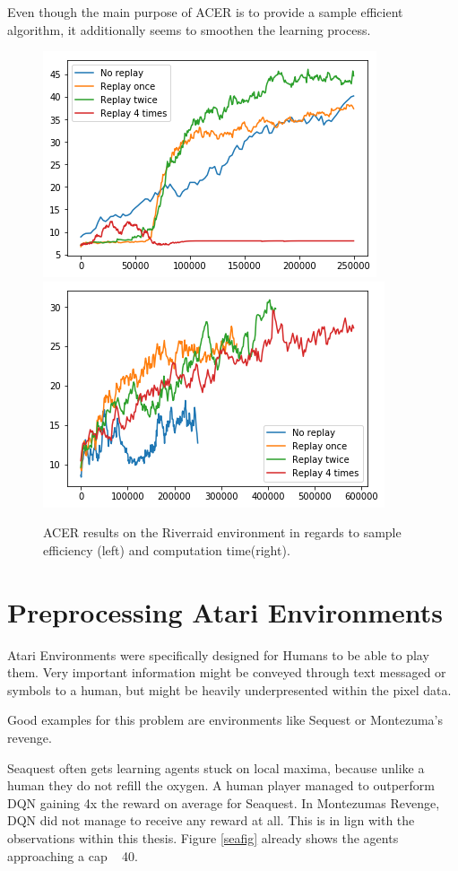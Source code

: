 Even though the main purpose of ACER is to provide a sample efficient algorithm, it additionally seems to smoothen the learning process.
\begin{figure}[h]
\includegraphics[scale=0.55]{bilder/riverraidbyonline.png}
\includegraphics[scale=0.55]{bilder/riverraidbytime.png}
\caption{ACER results on the Riverraid environment in regards to sample efficiency (left) and computation time(right).}

\end{figure}

\pagebreak

\section{Preprocessing Atari Environments}

Atari Environments were specifically designed for Humans to be able to play them. Very important information might be conveyed through text messaged or symbols to a human, but might be heavily underpresented within the pixel data.

Good examples for this problem are environments like Sequest or Montezuma's revenge. 

Seaquest often gets learning agents stuck on local maxima, because unlike a human they do not refill the oxygen.
A human player managed to outperform DQN \citep{nature} gaining 4x the reward on average for Seaquest. In Montezumas Revenge, DQN did not manage to receive any reward at all.
This is in lign with the observations within this thesis. Figure \ref{seafig} already shows the agents approaching a cap ~ 40.

